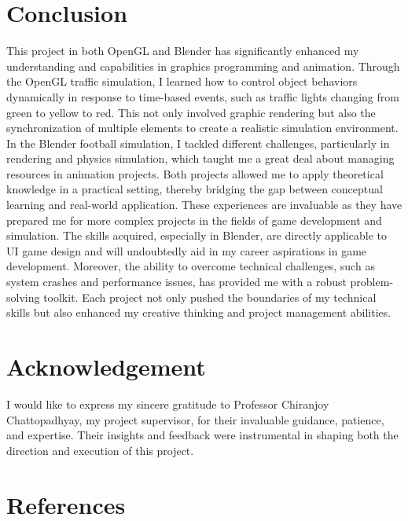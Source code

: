 \documentclass[ fontsize=11pt,twoside]{scrartcl}	%
\begin{document}
\clearpage

\section{Conclusion}

This project in both OpenGL and Blender has significantly enhanced my understanding and capabilities in graphics programming and animation. Through the OpenGL traffic simulation, I learned how to control object behaviors dynamically in response to time-based events, such as traffic lights changing from green to yellow to red. This not only involved graphic rendering but also the synchronization of multiple elements to create a realistic simulation environment.
\newline
\newline
In the Blender football simulation, I tackled different challenges, particularly in rendering and physics simulation, which taught me a great deal about managing resources in animation projects. Both projects allowed me to apply theoretical knowledge in a practical setting, thereby bridging the gap between conceptual learning and real-world application.
\newline
\newline
These experiences are invaluable as they have prepared me for more complex projects in the fields of game development and simulation. The skills acquired, especially in Blender, are directly applicable to UI game design and will undoubtedly aid in my career aspirations in game development.
\newline
\newline
Moreover, the ability to overcome technical challenges, such as system crashes and performance issues, has provided me with a robust problem-solving toolkit. Each project not only pushed the boundaries of my technical skills but also enhanced my creative thinking and project management abilities.

\section{Acknowledgement}
I would like to express my sincere gratitude to Professor Chiranjoy Chattopadhyay, my project supervisor, for their invaluable guidance, patience, and expertise. Their insights and feedback were instrumental in shaping both the direction and execution of this project.

\clearpage

\section{References}
\\
\end{document}
